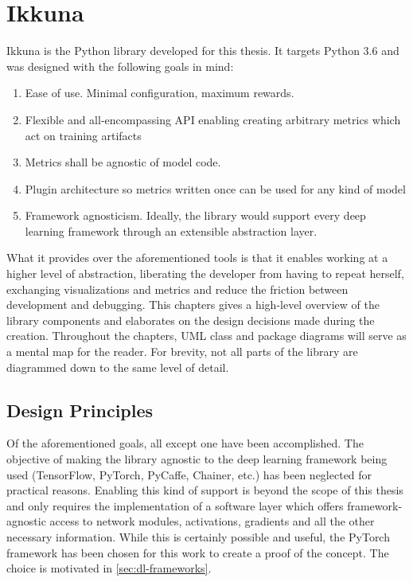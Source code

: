 \hypertarget{ikkuna}{%
\chapter{Ikkuna}\label{ikkuna}}

Ikkuna is the Python library developed for this thesis. It targets
Python 3.6 and was designed with the following goals in mind:

\begin{enumerate}
    \item
        Ease of use. Minimal configuration, maximum rewards.
    \item
        Flexible and all-encompassing API enabling creating arbitrary metrics
        which act on training artifacts
    \item
        Metrics shall be agnostic of model code.
    \item
        Plugin architecture so metrics written once can be used for any kind
        of model
    \item
        Framework agnosticism. Ideally, the library would support every deep
        learning framework through an extensible abstraction layer.
\end{enumerate}

What it provides over the aforementioned tools is that it enables
working at a higher level of abstraction, liberating the developer from
having to repeat herself, exchanging visualizations and metrics and
reduce the friction between development and debugging. This chapters gives a
high-level overview of the library components and elaborates on the design
decisions made during the creation. Throughout the chapters, UML class and
package diagrams will serve as a mental map for the reader. For brevity, not all
parts of the library are diagrammed down to the same level of detail.

\hypertarget{design-principles}{%
\section{Design Principles}\label{design-principles}}

Of the aforementioned goals, all except one have been accomplished. The
objective of making the library agnostic to the deep learning framework
being used (TensorFlow, PyTorch, PyCaffe, Chainer, etc.) has been
neglected for practical reasons. Enabling this kind of support is beyond
the scope of this thesis and only requires the implementation of a
software layer which offers framework-agnostic access to network
modules, activations, gradients and all the other necessary information.
While this is certainly possible and useful, the PyTorch framework has
been chosen for this work to create a proof of the concept. The choice is
motivated in \cref{sec:dl-frameworks}.

